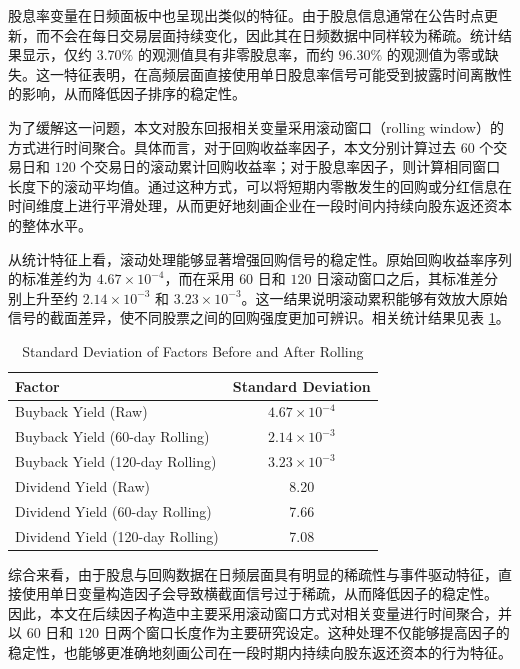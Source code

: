\documentclass[a4paper,10pt]{article}
\begin{document}
股息率变量在日频面板中也呈现出类似的特征。由于股息信息通常在公告时点更新，而不会在每日交易层面持续变化，因此其在日频数据中同样较为稀疏。统计结果显示，仅约 $3.70\%$ 的观测值具有非零股息率，而约 $96.30\%$ 的观测值为零或缺失。这一特征表明，在高频层面直接使用单日股息率信号可能受到披露时间离散性的影响，从而降低因子排序的稳定性。

为了缓解这一问题，本文对股东回报相关变量采用滚动窗口（rolling window）的方式进行时间聚合。具体而言，对于回购收益率因子，本文分别计算过去 $60$ 个交易日和 $120$ 个交易日的滚动累计回购收益率；对于股息率因子，则计算相同窗口长度下的滚动平均值。通过这种方式，可以将短期内零散发生的回购或分红信息在时间维度上进行平滑处理，从而更好地刻画企业在一段时间内持续向股东返还资本的整体水平。

从统计特征上看，滚动处理能够显著增强回购信号的稳定性。原始回购收益率序列的标准差约为 $4.67\times10^{-4}$，而在采用 $60$ 日和 $120$ 日滚动窗口之后，其标准差分别上升至约 $2.14\times10^{-3}$ 和 $3.23\times10^{-3}$。这一结果说明滚动累积能够有效放大原始信号的截面差异，使不同股票之间的回购强度更加可辨识。相关统计结果见表 \ref{tab:rolling_stats}。

\begin{table}[H]
\centering
\caption{Standard Deviation of Factors Before and After Rolling}
\label{tab:rolling_stats}
\begin{tabular}{lc}
\toprule
Factor & Standard Deviation \\
\midrule
Buyback Yield (Raw) & $4.67\times10^{-4}$ \\
Buyback Yield (60-day Rolling) & $2.14\times10^{-3}$ \\
Buyback Yield (120-day Rolling) & $3.23\times10^{-3}$ \\
Dividend Yield (Raw) & 8.20 \\
Dividend Yield (60-day Rolling) & 7.66 \\
Dividend Yield (120-day Rolling) & 7.08 \\
\bottomrule
\end{tabular}
\end{table}

综合来看，由于股息与回购数据在日频层面具有明显的稀疏性与事件驱动特征，直接使用单日变量构造因子会导致横截面信号过于稀疏，从而降低因子的稳定性。 因此，本文在后续因子构造中主要采用滚动窗口方式对相关变量进行时间聚合，并以 $60$ 日和 $120$ 日两个窗口长度作为主要研究设定。这种处理不仅能够提高因子的稳定性，也能够更准确地刻画公司在一段时期内持续向股东返还资本的行为特征。
\end{document}
